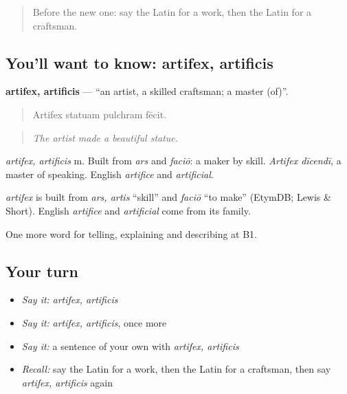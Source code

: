 \label{lesson:LA-C376-artifex}



\begin{quote}
Before the new one: say the Latin for a work, then the Latin for a craftsman.
\end{quote}

\subsection*{You'll want to know: artifex, artificis}
\textbf{artifex, artificis} — \textquotedblleft{}an artist, a skilled craftsman; a master (of)\textquotedblright{}.

\begin{quote}
Artifex statuam pulchram fēcit.
\end{quote}

\begin{quote}
\emph{The artist made a beautiful statue.}
\end{quote}

\emph{artifex, artificis} m. Built from \emph{ars} and \emph{faciō}: a maker by skill. \emph{Artifex dīcendī}, a master of speaking. English \emph{artifice} and \emph{artificial}.

\begin{cousinweb}
\emph{artifex} is built from \emph{ars, artis} \textquotedblleft{}skill\textquotedblright{} and \emph{faciō} \textquotedblleft{}to make\textquotedblright{} (EtymDB; Lewis \& Short). English \emph{artifice} and \emph{artificial} come from its family.
\end{cousinweb}

\begin{grammarlens}[title={What you've built}]
One more word for telling, explaining and describing at B1.
\end{grammarlens}

\subsection*{Your turn}
\begin{itemize}
\raggedright
  \item \emph{Say it:} \emph{artifex, artificis}
  \item \emph{Say it:} \emph{artifex, artificis}, once more
  \item \emph{Say it:} a sentence of your own with \emph{artifex, artificis}
  \item \emph{Recall:} say the Latin for a work, then the Latin for a craftsman, then say \emph{artifex, artificis} again
\end{itemize}

